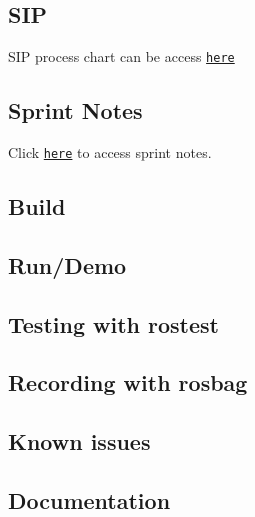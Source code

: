 \subsection*{S\+IP}

S\+IP process chart can be access \href{https://docs.google.com/spreadsheets/d/15FUiV2CVoGEMxKz0mKP8EMVmY0W706Poa8y_qtE8bmY/edit?usp=sharing}{\tt here}

\subsection*{Sprint Notes}

Click \href{https://docs.google.com/document/d/1l9LacTmeBo5nzlTT7CSJo50k2eist533l3HIxqJ_3jI/edit?usp=sharing}{\tt here} to access sprint notes.

\subsection*{Build}

\subsection*{Run/\+Demo}

\subsection*{Testing with rostest}

\subsection*{Recording with rosbag}

\subsection*{Known issues}

\subsection*{Documentation}